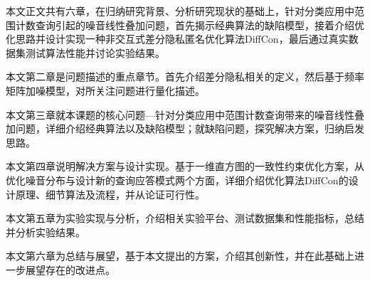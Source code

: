 本文正文共有六章，在归纳研究背景、分析研究现状的基础上，针对分类应用中范围计数查询引起的噪音线性叠加问题，首先揭示经典算法的缺陷模型，接着介绍优化思路并设计实现一种非交互式差分隐私匿名优化算法DiffCon，最后通过真实数据集测试算法性能并讨论实验结果。

本文第二章是问题描述的重点章节。首先介绍差分隐私相关的定义，然后基于频率矩阵加噪模型，对所关注问题进行量化描述。

本文第三章就本课题的核心问题---针对分类应用中范围计数查询带来的噪音线性叠加问题，详细介绍经典算法以及缺陷模型；就缺陷问题，探究解决方案，归纳启发思路。

本文第四章说明解决方案与设计实现。基于一维直方图的一致性约束优化方案，从优化噪音分布与设计新的查询应答模式两个方面，详细介绍优化算法DiffCon的设计原理、细节算法及流程，并从论证可行性。

本文第五章为实验实现与分析，介绍相关实验平台、测试数据集和性能指标，总结并分析实验结果。

本文第六章为总结与展望，基于本文提出的方案，介绍其创新性，并在此基础上进一步展望存在的改进点。